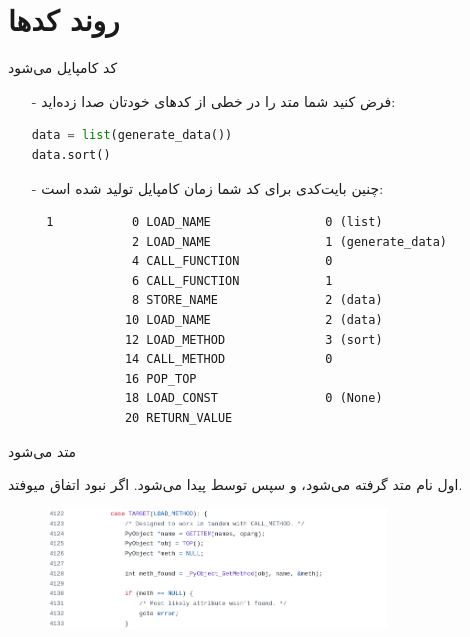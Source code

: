 \section{روند کد‌ها}
\begin{frame}[fragile]{کد کامپایل می‌شود}
\begin{itemize}\itemr
\item[-]
فرض کنید شما متد
را در خطی از کد‌های خودتان صدا زده‌اید:

\begin{latin}
\begin{lstlisting}[language=python]
data = list(generate_data())
data.sort()
\end{lstlisting}
\end{latin}

\item[-]
چنین بایت‌کدی برای کد شما زمان کامپایل تولید شده است:

\begin{latin}
\begin{lstlisting}
  1           0 LOAD_NAME                0 (list)
              2 LOAD_NAME                1 (generate_data)
              4 CALL_FUNCTION            0
              6 CALL_FUNCTION            1
              8 STORE_NAME               2 (data)
             10 LOAD_NAME                2 (data)
             12 LOAD_METHOD              3 (sort)
             14 CALL_METHOD              0
             16 POP_TOP
             18 LOAD_CONST               0 (None)
             20 RETURN_VALUE
\end{lstlisting}
\end{latin}
\end{itemize}
\end{frame}

\begin{frame}[fragile]{متد  می‌شود}
\begin{flushright}
اول نام متد گرفته می‌شود، و سپس توسط 
پیدا می‌شود. اگر نبود  اتفاق میوفتد.
\end{flushright}
\begin{figure}[H]
\begin{center}
\includegraphics[width=0.8\textwidth, height=0.5\textheight]{docs/images/load-1}
\end{center}
\end{figure}
\end{frame}

